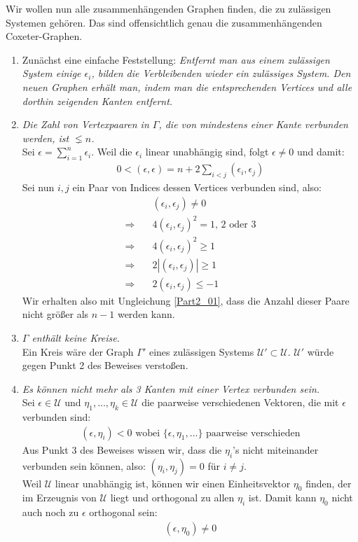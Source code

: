 \documentclass[a4paper,12pt]{article}
\begin{document}
Wir wollen nun alle zusammenhängenden Graphen finden, die zu zulässigen Systemen gehören. Das sind offensichtlich genau die zusammenhängenden Coxeter-Graphen.
\begin{enumerate}
\item Zunächst eine einfache Feststellung: \emph{Entfernt man aus einem zulässigen System einige $\epsilon_i$, bilden die Verbleibenden wieder ein zulässiges System. Den neuen Graphen erhält man, indem man die entsprechenden Vertices und alle dorthin zeigenden Kanten entfernt.}

\item \emph{Die Zahl von Vertexpaaren in $\Gamma$, die von mindestens einer Kante verbunden werden, ist $\lneq n$.}\\
Sei $\epsilon = \sum_{i=1}^n \epsilon_i$. Weil die $\epsilon_i$ linear unabhängig sind, folgt $\epsilon \neq 0$ und damit: 
\begin{align}
 0<(\epsilon,\epsilon) = n + 2 \sum_{i<j} (\epsilon_i, \epsilon_j)
 \label{Part2_01}
\end{align}
Sei nun $i,j$ ein Paar von Indices dessen Vertices verbunden sind, also:
\begin{align*}
&(\epsilon_i,\epsilon_j) \neq 0\\
\Rightarrow \quad &4(\epsilon_i,\epsilon_j)^2 = 1,\,2 \text{ oder } 3\\
\Rightarrow \quad &4(\epsilon_i,\epsilon_j)^2 \geq 1\\
\Rightarrow \quad &2|(\epsilon_i,\epsilon_j)| \geq 1\\
\Rightarrow \quad &2(\epsilon_i,\epsilon_j) \leq -1
\end{align*}
Wir erhalten also mit Ungleichung \eqref{Part2_01}, dass die Anzahl dieser Paare nicht größer als $n-1$ werden kann. 

\item \emph{$\Gamma$ enthält keine Kreise.}\\
Ein Kreis wäre der Graph $\Gamma'$ eines zulässigen Systems $\mathcal{U'} \subset \mathcal{U}$. $\mathcal{U'}$ würde gegen Punkt 2 des Beweises verstoßen.


\item \emph{Es können nicht mehr als 3 Kanten mit einer Vertex verbunden sein.}\\
Sei $\epsilon \in \mathcal{U}$ und $\eta_1, \ldots , \eta_k \in \mathcal{U}$ die paarweise verschiedenen Vektoren, die mit $\epsilon$ verbunden sind: 
\begin{align*}
(\epsilon,\eta_i) < 0 \text{ wobei } \{\epsilon, \eta_1, \ldots\} \text{ paarweise verschieden}
\end{align*}
Aus Punkt 3 des Beweises wissen wir, dass die $\eta_i$'s nicht miteinander verbunden sein können, also: $(\eta_i,\eta_j) = 0 $ für $i\neq j$.\\
Weil $\mathcal{U}$ linear unabhängig ist, können wir einen Einheitsvektor $\eta_0$ finden, der im Erzeugnis von $\mathcal{U}$ liegt und orthogonal zu allen $\eta_i$ ist. Damit kann $\eta_0$ nicht auch noch zu $\epsilon$ orthogonal sein: 
\begin{align}
(\epsilon,\eta_0) \neq 0
\label{Part4_01}
\end{align}


\end{enumerate}
\end{document}
